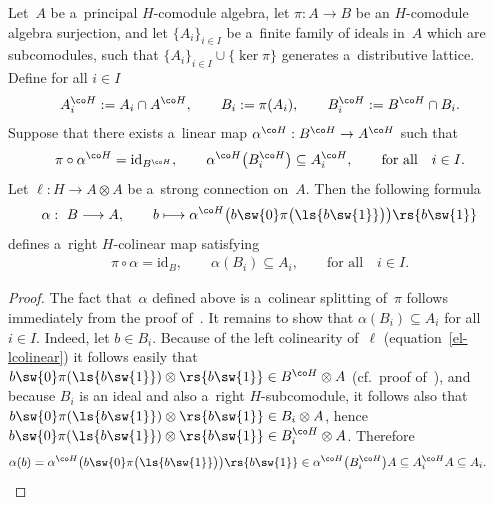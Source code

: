\begin{lemma}
\label{alphaexists}
Let~$A$ be a~principal $H$-comodule algebra, let $\pi:A\rightarrow B$ be an $H$-comodule algebra surjection, and let
$\{A_i\}_{i\in I}$ be a~finite family of ideals in~$A$ which are subcomodules, such that $\{A_i\}_{i\in
I}\cup\{\ker\pi\}$ generates a~distributive lattice.
Define for all $i\in I$
\begin{gather*}
A_i^{\co H}:=A_i\cap A^{\co H},
\qquad
B_i:=\pi(A_i),
\qquad
B_i^{\co H}:=B^{\co H}\cap B_i.
\end{gather*}
Suppose that there exists a~linear map $\alpha^{\co H}:B^{\co H}\rightarrow A^{\co H}$ such that
\begin{gather*}
\pi\circ\alpha^{\co H}=\mathrm{id}_{B^{\co H}},
\qquad
\alpha^{\co H}\big(B^{\co H}_i\big)\subseteq A_i^{\co H},
\qquad
\text{for all}
\quad
i\in I.
\end{gather*}
Let $\ell:H\rightarrow A\otimes A$ be a~strong connection on~$A$.
Then the following formula
\begin{gather*}
\alpha: \ B\longrightarrow A,
\qquad
b\longmapsto \alpha^{\co H}\big(b\sw{0}\pi\big(\ls{b\sw{1}}\big)\big)\rs{b\sw{1}}
\end{gather*}
defines a~right $H$-colinear map satisfying
\begin{gather*}
\pi\circ\alpha=\mathrm{id}_{B},
\qquad
\alpha(B_i)\subseteq A_i,
\qquad
\text{for all}
\quad
i\in I.
\end{gather*}
\end{lemma}
\begin{proof}
The fact that~$\alpha$ def\/ined above is a~colinear splitting of~$\pi$ follows immediately from the proof of~\cite[Lemma~3.1]{hkmz11}.
It remains to show that $\alpha(B_i)\subseteq A_i$ for all $i\in I$.
Indeed, let $b\in B_i$.
Because of the left colinearity of~$\ell$ (equation~\eqref{el-lcolinear}) it follows easily that
$b\sw{0}\pi(\ls{b\sw{1}})\otimes\rs{b\sw{1}}\in B^{\co H}\otimes A$ (cf.\
proof of~\cite[Lemma~3.1]{hkmz11}), and because $B_i$ is an ideal and also a~right $H$-subcomodule, it follows also that
$b\sw{0}\pi(\ls{b\sw{1}})\otimes\rs{b\sw{1}}\in B_i\otimes A$, hence $b\sw{0}\pi(\ls{b\sw{1}})\otimes\rs{b\sw{1}}\in B^{\co H}_i\otimes A$.
Therefore
\begin{gather*}
\alpha(b)=\alpha^{\co H}\big(b\sw{0}\pi\big(\ls{b\sw{1}}\big)\big)\rs{b\sw{1}} \in \alpha^{\co H}\big(B_i^{\co
H}\big)A\subseteq A^{\co H}_iA\subseteq A_i.\tag*{\qed}
\end{gather*}
\renewcommand{\qed}{}
\end{proof}

